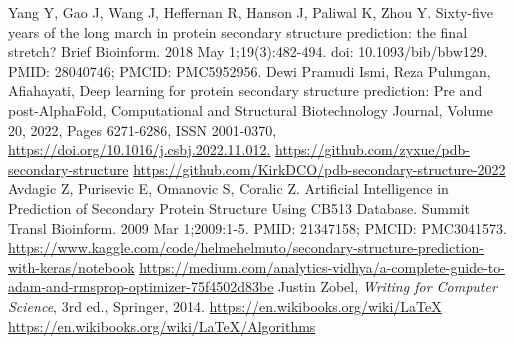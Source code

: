 \documentclass[conference]{IEEEtran}
\begin{document}
\begin{thebibliography}{00}
 Yang Y, Gao J, Wang J, Heffernan R, Hanson J, Paliwal K, Zhou Y. Sixty-five years of the long march in protein secondary structure prediction: the final stretch? Brief Bioinform. 2018 May 1;19(3):482-494. doi: 10.1093/bib/bbw129. PMID: 28040746; PMCID: PMC5952956.
 Dewi Pramudi Ismi, Reza Pulungan,  Afiahayati,
Deep learning for protein secondary structure prediction: Pre and post-AlphaFold,
Computational and Structural Biotechnology Journal,
Volume 20, 2022, Pages 6271-6286, ISSN 2001-0370,
\url{https://doi.org/10.1016/j.csbj.2022.11.012.}
 \url{https://github.com/zyxue/pdb-secondary-structure}
 \url{https://github.com/KirkDCO/pdb-secondary-structure-2022}
 Avdagic Z, Purisevic E, Omanovic S, Coralic Z. Artificial Intelligence in Prediction of Secondary Protein Structure Using CB513 Database. Summit Transl Bioinform. 2009 Mar 1;2009:1-5. PMID: 21347158; PMCID: PMC3041573.
\url{https://www.kaggle.com/code/helmehelmuto/secondary-structure-prediction-with-keras/notebook}
 \url{https://medium.com/analytics-vidhya/a-complete-guide-to-adam-and-rmsprop-optimizer-75f4502d83be}
 Justin Zobel, {\it Writing for Computer Science}, 3rd ed., Springer, 2014.
 \url{https://en.wikibooks.org/wiki/LaTeX}
 \url{https://en.wikibooks.org/wiki/LaTeX/Algorithms}
\end{thebibliography}
\end{document}
